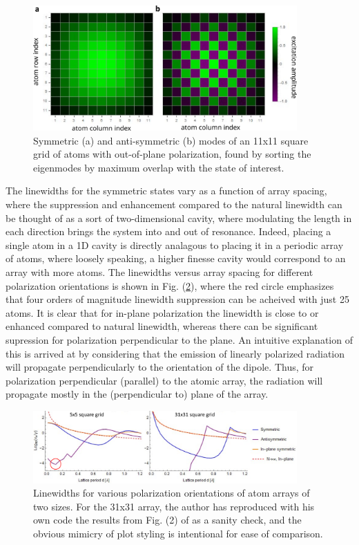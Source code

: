 \begin{figure}[!ht]
    \centering
    \includegraphics[width=0.9\textwidth]{Images/symm_anti_symm_modes.pdf}
    \caption{Symmetric (a) and anti-symmetric (b) modes of an 11x11 square grid of atoms with out-of-plane polarization, found by sorting the eigenmodes by maximum overlap with the state of interest.}
    \label{fig:symm_antisymm_modes}
\end{figure}

The linewidths for the symmetric states vary as a function of array spacing, where the suppression and enhancement compared to the natural linewidth can be thought of as a sort of two-dimensional cavity, where modulating the length in each direction brings the system into and out of resonance. Indeed, placing a single atom in a 1D cavity is directly analagous to placing it in a periodic array of atoms, where loosely speaking, a higher finesse cavity would correspond to an array with more atoms. The linewidths versus array spacing for different polarization orientations is shown in Fig. (\ref{fig:collective_linewidths_2d}), where the red circle emphasizes that four orders of magnitude linewidth suppression can be acheived with just 25 atoms. It is clear that for in-plane polarization the linewidth is close to or enhanced compared to natural linewidth, whereas there can be significant supression for polarization perpendicular to the plane. An intuitive explanation of this is arrived at by considering that the emission of linearly polarized radiation will propagate perpendicularly to the orientation of the dipole. Thus, for polarization perpendicular (parallel) to the atomic array, the radiation will propagate mostly in the (perpendicular to) plane of the array.

\begin{figure}[!ht]
    \centering
    \includegraphics[width=0.9\textwidth]{Images/collective_linewidths_2d.pdf}
    \caption{Linewidths for various polarization orientations of atom arrays of two sizes. For the 31x31 array, the author has reproduced with his own code the results from Fig. (2) of \cite{ballantine2020subradiance} as a sanity check, and the obvious mimicry of plot styling is intentional for ease of comparison.}
    \label{fig:collective_linewidths_2d}
\end{figure}

